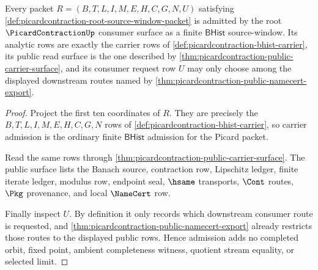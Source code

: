 \begin{theorem}
\label{thm:picardcontraction-root-source-window-admission}
Every packet $R=(B,T,L,I,M,E,H,C,G,N,U)$ satisfying
\autoref{def:picardcontraction-root-source-window-packet} is admitted by the
root $\PicardContractionUp$ consumer surface as a finite $\mathsf{BHist}$
source-window. Its analytic rows are exactly the carrier rows of
\autoref{def:picardcontraction-bhist-carrier}, its public read surface is the
one described by \autoref{thm:picardcontraction-public-carrier-surface}, and
its consumer request row $U$ may only choose among the displayed downstream
routes named by \autoref{thm:picardcontraction-public-namecert-export}.
\end{theorem}
\begin{proof}
Project the first ten coordinates of $R$. They are precisely the
$B,T,L,I,M,E,H,C,G,N$ rows of \autoref{def:picardcontraction-bhist-carrier},
so carrier admission is the ordinary finite $\mathsf{BHist}$ admission for
the Picard packet.

Read the same rows through \autoref{thm:picardcontraction-public-carrier-surface}.
The public surface lists the Banach source, contraction row, Lipschitz ledger,
finite iterate ledger, modulus row, endpoint seal, $\hsame$ transports,
$\Cont$ routes, $\Pkg$ provenance, and local $\NameCert$ row.

Finally inspect $U$. By definition it only records which downstream consumer
route is requested, and \autoref{thm:picardcontraction-public-namecert-export}
already restricts those routes to the displayed public rows. Hence admission
adds no completed orbit, fixed point, ambient completeness witness, quotient
stream equality, or selected limit.
\end{proof}

